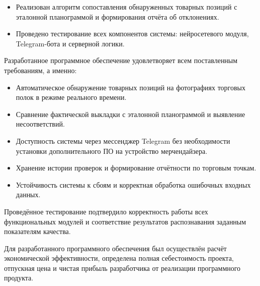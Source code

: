 {\begin{itemize}[leftmargin=2.15cm, labelwidth=0.65cm, labelsep=0.0cm]
		\item[\theitemcntr.] Реализован алгоритм сопоставления обнаруженных товарных позиций с эталонной планограммой и формирования отчёта об отклонениях.
		\addtocounter{itemcntr}{1}
		
		\item[\theitemcntr.] Проведено тестирование всех компонентов системы: нейросетевого модуля, Telegram-бота и серверной логики.
		\addtocounter{itemcntr}{1}

		\setcounter{itemcntr}{1}
	\end{itemize} 

	\par \redline Разработанное программное обеспечение удовлетворяет всем поставленным требованиям, а именно:
	
	\begin{itemize}[leftmargin=2.15cm, labelwidth=0.65cm, labelsep=0.0cm] 
		
		\item[\theitemcntr.] Автоматическое обнаружение товарных позиций на фотографиях торговых полок в режиме реального времени.
		\addtocounter{itemcntr}{1}
		
		\item[\theitemcntr.] Сравнение фактической выкладки с эталонной планограммой и выявление несоответствий.
		\addtocounter{itemcntr}{1}
		
		\item[\theitemcntr.] Доступность системы через мессенджер Telegram без необходимости установки дополнительного ПО на устройство мерчендайзера.
		\addtocounter{itemcntr}{1}
		
		\item[\theitemcntr.] Хранение истории проверок и формирование отчётности по торговым точкам.
		\addtocounter{itemcntr}{1}
		
		\item[\theitemcntr.] Устойчивость системы к сбоям и корректная обработка ошибочных входных данных.
		\addtocounter{itemcntr}{1}
		
		\setcounter{itemcntr}{1}
	\end{itemize}  
	  
	\par \redline Проведённое тестирование подтвердило корректность работы всех функциональных модулей и соответствие результатов распознавания заданным показателям качества.

	\par \redline Для разработанного программного обеспечения был осуществлён расчёт экономической эффективности, определена полная себестоимость проекта, отпускная цена и чистая прибыль разработчика от реализации программного продукта.
	
}

\setcounter{subchaptercntr}{1}
\setcounter{formulacntr}{1}
\setcounter{imagecntr}{1}